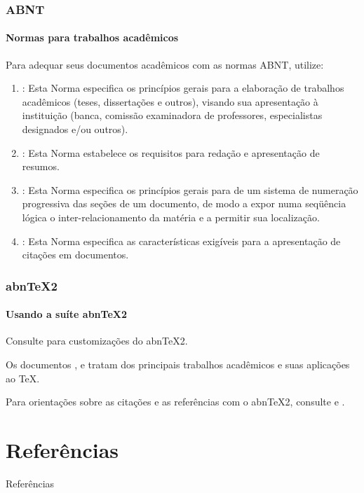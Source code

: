 \documentclass[aspectratio=169]{beamer}	 	%
\begin{document}
\begin{frame}
\frametitle{ABNT}
\framesubtitle{Normas para trabalhos acadêmicos}

Para adequar seus documentos acadêmicos com as normas ABNT, utilize:
\begin{enumerate}
 \item {}: Esta Norma especifica os princípios gerais para a elaboração de trabalhos acadêmicos (teses, dissertações e outros), visando sua apresentação à instituição (banca, comissão examinadora de professores, especialistas designados e/ou outros).
 \item {}: Esta Norma estabelece os requisitos para redação e apresentação de resumos.
 \item {}: Esta Norma especifica os princípios gerais para de um sistema de numeração progressiva das seções de um documento, de modo a expor numa
seqüência lógica o inter-relacionamento da matéria e a permitir sua localização.
 \item {}: Esta Norma especifica as características exigíveis para a apresentação de citações em documentos.
\end{enumerate}

\end{frame}

\begin{frame}
\frametitle{abnTeX2}
\framesubtitle{Usando a suíte abnTeX2}

Consulte  para customizações do abnTeX2.
\vspace{0.5cm}

Os documentos ,  e  tratam dos principais trabalhos acadêmicos e suas aplicações ao TeX.
\vspace{0.5cm}

Para orientações sobre as citações e as referências com o abnTeX2, consulte  e .
\vspace{0.5cm}

\end{frame}

\section{Referências}


\begin{frame}[allowframebreaks]{Referências}

\end{frame}

\end{document}
